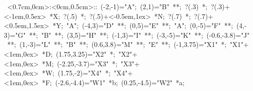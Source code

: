 
%

\hbox{
\xy    <0.7cm,0cm>:<0cm,0.5cm>::
       (-2,-1)="A"; (2,1)="B"  **\dir{-};
       ?(.3) *{\bullet}; ?(.3)+<-1em,0.5ex> *{X};
       ?(.5) *{\bullet}; ?(.5)+<-0.5em,1ex> *{N};
       ?(.7) *{\bullet}; ?(.7)+<0.5em,1.5ex> *{Y};
       "A"; (-4,3)="D" **\dir{-}; (0,5)="E" **\dir{-};
       "A"; (0,-5)="F" **\dir{-}; (4,-3)="G" **\dir{-};
       "B" **\dir{-}; (3,5)="H" **\dir{-}; (-1,3)="I" **\dir{-};
       (-3,-5)="K" **\dir{-}; (-0.6,-3.8)="J" **\dir{-};
       (1,-3)="L" **\dir{--}; "B" **\dir{--}; 
       (0.6,3.8)="M" **\dir{--}; "E" **\dir{-};
       (-1,3.75)="X1" *{\bullet}; "X1"+<1em,0ex> *{D}; 
       (1.75,3.25)="X2" *{\bullet}; "X2"+<1em,0ex> *{M}; 
       (-2.25,-3.7)="X3" *{\bullet}; "X3"+<1em,0ex> *{W}; 
       (1.75,-2)="X4" *{\bullet}; "X4"+<1em,0ex> *{F}; 
       (-2.6,-4.4)="W1" *{b}; 
       (0.25,-4.5)="W2" *{a}; 
       \endxy}
